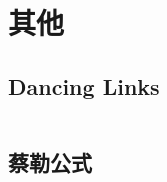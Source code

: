 \chapter{其他}
\section{Dancing Links}
\inputminted{cpp}{\source/others/dancing-links.cpp}
\section{蔡勒公式}
\inputminted{cpp}{\source/others/zellers-congruence.cpp}
